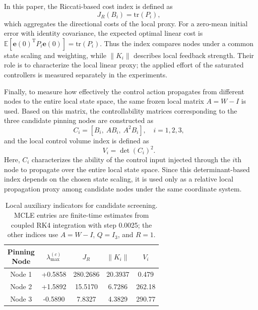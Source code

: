 \documentclass[a4paper,fleqn]{cas-sc}
\theoremstyle{plain}
\theoremstyle{definition}
\begin{document}
In this paper, the Riccati-based cost index is defined as
\begin{equation}
	J_R(B_i)=\mathrm{tr}(P_i),
	\label{eq:riccati_cost_index}
\end{equation}
which aggregates the directional costs of the local proxy. For a zero-mean initial error with identity covariance, the expected optimal linear cost is $\mathbb{E}[\mathbf e(0)^{\mathrm T}P_i\mathbf e(0)]=\mathrm{tr}(P_i)$. Thus the index compares nodes under a common state scaling and weighting, while $\|K_i\|$ describes local feedback strength. Their role is to characterize the local linear proxy; the applied effort of the saturated controllers is measured separately in the experiments.

Finally, to measure how effectively the control action propagates from different nodes to the entire local state space, the same frozen local matrix $A=W-I$ is used. Based on this matrix, the controllability matrices corresponding to the three candidate pinning nodes are constructed as~\cite{kailath1980linear}
\begin{equation}
	C_i=
	\left[
	B_i,\ AB_i,\ A^2B_i
	\right],
	\quad i=1,2,3,
	\label{eq:controllability_matrices}
\end{equation}
and the local control volume index is defined as
\begin{equation}
	V_i=\det(C_i)^2.
	\label{eq:control_volume}
\end{equation}
Here, $C_i$ characterizes the ability of the control input injected through the $i$th node to propagate over the entire local state space. Since this determinant-based index depends on the chosen state scaling, it is used only as a relative local propagation proxy among candidate nodes under the same coordinate system.

\begin{table}[pos=htbp,width=\linewidth]
	\centering
	\setlength{\tabcolsep}{3pt}
	\renewcommand{\arraystretch}{1.12}
	\caption{Local auxiliary indicators for candidate screening. MCLE entries are finite-time estimates from coupled RK4 integration with step 0.0025; the other indices use $A=W-I$, $Q=I_3$, and $R=1$.}
	\label{tab:local_node_metrics}
	\begin{tabular}{@{}ccccc@{}}
		\toprule
		\makecell{Pinning\\Node} 
		& $\lambda_{\max}^{(c)}$ 
		& $J_R$ 
		& $\|K_i\|$ 
		& $V_i$ \\
		\midrule
		Node 1 & +0.5858 & 280.2686 & 20.3937 & 0.479 \\
		Node 2 & +1.5892 & 15.5170 & 6.7286 & 262.18 \\
		Node 3 & -0.5890 & 7.8327 & 4.3829 & 290.77 \\
		\bottomrule
	\end{tabular}
\end{table}
\end{document}
